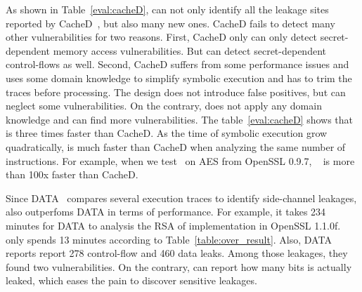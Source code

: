 As shown in Table~\ref{eval:cacheD},
\tool{} can not only identify all the leakage sites reported by CacheD~\cite{203878}, but also
many new ones. CacheD fails to detect many other vulnerabilities for two
reasons. First, CacheD only can only detect secret-dependent memory access
vulnerabilities. But \tool{} can detect secret-dependent control-flows as well.
Second, CacheD suffers from some performance issues and uses some domain
knowledge to simplify symbolic execution and has to trim the traces before
processing. The design does not introduce false positives, but can neglect some
vulnerabilities. On the contrary, \tool{} does not apply any domain knowledge
and can find more vulnerabilities. The table~\ref{eval:cacheD} shows that
\tool{} is three times faster than CacheD. As the time of symbolic execution
grow quadratically, \tool{} is much faster than CacheD when analyzing the same
number of instructions. For example, when we test~\tool{} on AES from OpenSSL
0.9.7, ~\tool{} is more than 100x faster than CacheD.

Since DATA~\cite{217537} compares several execution traces to identify
side-channel leakages, \tool{} also outperfoms DATA in terms of performance.
For example, it takes 234 minutes for DATA to analysis the RSA of implementation
in OpenSSL 1.1.0f. \tool{} only spends 13 minutes according to Table~\ref{table:over_result}.
Also, DATA reports report 278 control-flow and 460 data leaks. Among those leakages,
they found two vulnerabilities. On the contrary, \tool{} can report how many bits is 
actually leaked, which eases the pain to discover sensitive leakages.



